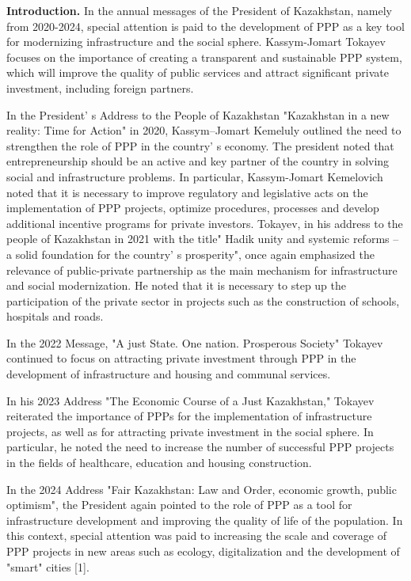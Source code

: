 \begin{multicols}{2}
{\bfseries Introduction.} In the annual messages of the President of
Kazakhstan, namely from 2020-2024, special attention is paid to the
development of PPP as a key tool for modernizing infrastructure and the
social sphere. Kassym-Jomart Tokayev focuses on the importance of
creating a transparent and sustainable PPP system, which will improve
the quality of public services and attract significant private
investment, including foreign partners.

In the President' s Address to the People of Kazakhstan
"Kazakhstan in a new reality: Time for Action" in 2020, Kassym--Jomart
Kemeluly outlined the need to strengthen the role of PPP in the
country' s economy. The president noted that
entrepreneurship should be an active and key partner of the country in
solving social and infrastructure problems. In particular, Kassym-Jomart
Kemelovich noted that it is necessary to improve regulatory and
legislative acts on the implementation of PPP projects, optimize
procedures, processes and develop additional incentive programs for
private investors. Tokayev, in his address to the people of Kazakhstan
in 2021 with the title" Hadik unity and systemic reforms -- a solid
foundation for the country' s prosperity", once again
emphasized the relevance of public-private partnership as the main
mechanism for infrastructure and social modernization. He noted that it
is necessary to step up the participation of the private sector in
projects such as the construction of schools, hospitals and roads.

In the 2022 Message, "A just State. One nation. Prosperous Society"
Tokayev continued to focus on attracting private investment through PPP
in the development of infrastructure and housing and communal services.

In his 2023 Address "The Economic Course of a Just Kazakhstan," Tokayev
reiterated the importance of PPPs for the implementation of
infrastructure projects, as well as for attracting private investment in
the social sphere. In particular, he noted the need to increase the
number of successful PPP projects in the fields of healthcare, education
and housing construction.

In the 2024 Address "Fair Kazakhstan: Law and Order, economic growth,
public optimism", the President again pointed to the role of PPP as a
tool for infrastructure development and improving the quality of life of
the population. In this context, special attention was paid to
increasing the scale and coverage of PPP projects in new areas such as
ecology, digitalization and the development of "smart" cities {[}1{]}.


\end{multicols}
